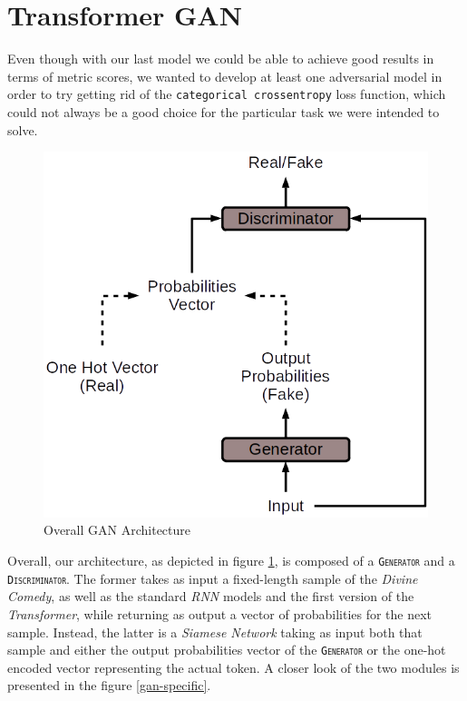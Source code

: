 \section{Transformer GAN}

Even though with our last model we could be able to achieve good results in terms of metric scores, we wanted to develop at least one adversarial model \cite{goodfellow2014generative} in order to try getting rid of the \texttt{categorical crossentropy} loss function, which could not always be a good choice for the particular task we were intended to solve.

\begin{figure}[!htb]
    \centering
    \includegraphics[scale=0.65]{images/model-6-general.png}%
    \caption{Overall GAN Architecture}%
    \label{gan-general}
\end{figure}

Overall, our architecture, as depicted in figure \ref{gan-general}, is composed of a \texttt{\textsc{Generator}} and a \texttt{\textsc{Discriminator}}.
The former takes as input a fixed-length sample of the \textit{Divine Comedy}, as well as the standard \textit{RNN} models and the first version of the \textit{Transformer}, while returning as output a vector of probabilities for the next sample.
Instead, the latter is a \textit{Siamese Network} taking as input both that sample and either the output probabilities vector of the \texttt{\textsc{Generator}} or the one-hot encoded vector representing the actual token.
A closer look of the two modules is presented in the figure \ref{gan-specific}.

